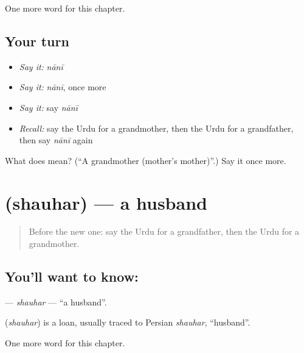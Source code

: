 \begin{grammarlens}[title={What you've built}]
One more word for this chapter.
\end{grammarlens}

\subsection*{Your turn}
\begin{itemize}
\raggedright
  \item \emph{Say it:} \emph{nānī}
  \item \emph{Say it:} \emph{nānī}, once more
  \item \emph{Say it:} say \emph{nānī}
  \item \emph{Recall:} say the Urdu for a grandmother, then the Urdu for a grandfather, then say \emph{nānī} again
\end{itemize}

\begin{tcolorbox}[breakable,colback=teal!4,colframe=teal!35!black,title={Before you move on}]
What does  mean? (\textquotedblleft{}A grandmother (mother's mother)\textquotedblright{}.) Say it once more.
\end{tcolorbox}
\section[\texorpdfstring{\ur{شوہر} (shauhar)}{شوہر (shauhar)}]{ (shauhar) — a husband}

\label{lesson:UR-C44-shauhar}



\begin{quote}
Before the new one: say the Urdu for a grandfather, then the Urdu for a grandmother.
\end{quote}

\subsection*{You'll want to know: }
\textbf{} — \emph{shauhar} — \textquotedblleft{}a husband\textquotedblright{}.

\begin{cousinweb}
\textbf{} (\emph{shauhar}) is a loan, usually traced to Persian \emph{shauhar}, \textquotedblleft{}husband\textquotedblright{}.
\end{cousinweb}

\begin{grammarlens}[title={What you've built}]
One more word for this chapter.
\end{grammarlens}

